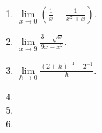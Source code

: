 \begin{multicols}{2}
\begin{enumerate}[ref={\fcProblemRef}]
\item $\displaystyle\lim\limits_{x\to 0}\left(\frac{1}x -\frac{1}{x^2+x}\right)$.

\item $\displaystyle\lim\limits_{x\to 9} \frac{3-\sqrt{x}}{9x-x^2}$.

\item $\displaystyle\lim\limits_{h \to 0}\frac{(2+h)^{-1}-2^{-1}}{h} $.

\item 
\item 

\item 

\end{enumerate}
\end{multicols}
